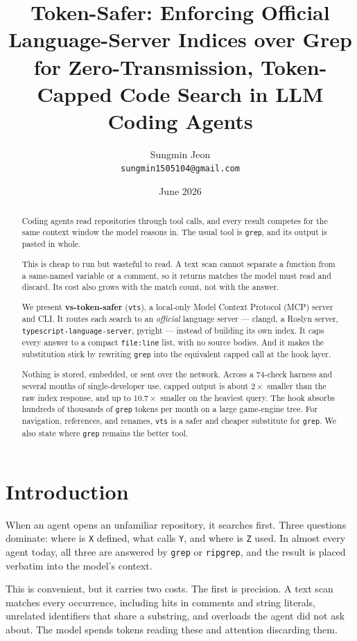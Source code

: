 \documentclass[11pt]{article}
\title{\textbf{Token-Safer: Enforcing Official Language-Server Indices over
Grep for Zero-Transmission, Token-Capped Code Search in LLM Coding Agents}}
\author{
  Sungmin Jeon\\
  \texttt{sungmin1505104@gmail.com}
}
\date{June 2026}
\begin{document}
\maketitle

\begin{abstract}
Coding agents read repositories through tool calls, and every result competes for
the same context window the model reasons in. The usual tool is \texttt{grep}, and
its output is pasted in whole.

This is cheap to run but wasteful to read. A text scan cannot separate a function
from a same-named variable or a comment, so it returns matches the model must read
and discard. Its cost also grows with the match count, not with the answer.

We present \textbf{vs-token-safer} (\texttt{vts}), a local-only Model Context
Protocol (MCP) server and CLI. It routes each search to an \emph{official} language
server --- clangd, a Roslyn server, \texttt{typescript-language-server}, pyright ---
instead of building its own index. It caps every answer to a compact
\texttt{file:line} list, with no source bodies. And it makes the substitution stick
by rewriting \texttt{grep} into the equivalent capped call at the hook layer.

Nothing is stored, embedded, or sent over the network. Across a 74-check harness
and several months of single-developer use, capped output is about $2\times$
smaller than the raw index response, and up to $10.7\times$ smaller on the heaviest
query. The hook absorbs hundreds of thousands of \texttt{grep} tokens per month on
a large game-engine tree. For navigation, references, and renames, \texttt{vts} is
a safer and cheaper substitute for \texttt{grep}. We also state where \texttt{grep}
remains the better tool.
\end{abstract}

\section{Introduction}
\label{sec:intro}

When an agent opens an unfamiliar repository, it searches first. Three questions
dominate: where is \texttt{X} defined, what calls \texttt{Y}, and where is
\texttt{Z} used. In almost every agent today, all three are answered by
\texttt{grep} or \texttt{ripgrep}, and the result is placed verbatim into the
model's context.

This is convenient, but it carries two costs. The first is precision. A text scan
matches every occurrence, including hits in comments and string literals, unrelated
identifiers that share a substring, and overloads the agent did not ask about. The
model spends tokens reading these and attention discarding them.
\end{document}
